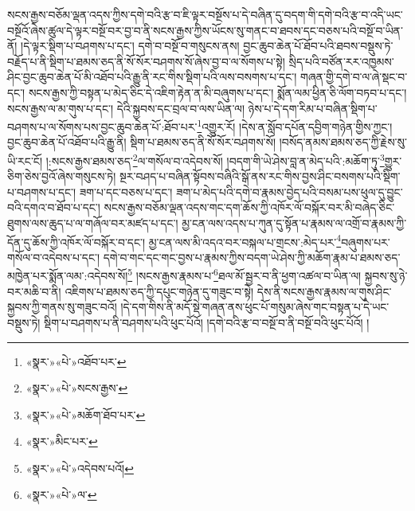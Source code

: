 སངས་རྒྱས་བཅོམ་ལྡན་འདས་ཀྱིས་དགེ་བའི་རྩ་བ་ཇི་ལྟར་བསྔོས་པ་དེ་བཞིན་དུ་བདག་གི་དགེ་བའི་རྩ་བ་འདི་ཡང་བསྔོའོ་ཞེས་ཚུལ་དེ་ལྟར་བསྔོ་བར་བྱ་བ་ནི་སངས་རྒྱས་ཀྱིས་ཡོངས་སུ་གནང་བ་ཐབས་དང་བཅས་པའི་བསྔོ་བ་ཡིན་ནོ། །དེ་ལྟར་སྡིག་པ་བཤགས་པ་དང་། དགེ་བ་བསྔོ་བ་གསུངས་ནས། བྱང་ཆུབ་ཆེན་པོ་ཐོབ་པའི་ཐབས་བསྡུས་ཏེ་བརྗོད་པ་ནི་སྡིག་པ་ཐམས་ཅད་ནི་སོ་སོར་བཤགས་སོ་ཞེས་བྱ་བ་ལ་སོགས་པ་སྟེ། སྲིད་པའི་བཙོན་རར་འཁྱམས་ཤིང་བྱང་ཆུབ་ཆེན་པོ་མི་འཐོབ་པའི་རྒྱུ་ནི་རང་གིས་སྡིག་པའི་ལས་བསགས་པ་དང་། གཞན་གྱི་དགེ་བ་ལ་ཞེ་སྡང་བ་དང་། སངས་རྒྱས་ཀྱི་བསྟན་པ་མེད་ཅིང་དེ་འཇིག་རྟེན་ན་མི་བཞུགས་པ་དང་། སྨོན་ལམ་ཕྱིན་ཅི་ལོག་བཏབ་པ་དང་། སངས་རྒྱས་ལ་མ་གུས་པ་དང་། དེའི་སྐྱབས་དང་བྲལ་བ་ལས་ཡིན་ལ། ཉེས་པ་དེ་དག་རིམ་པ་བཞིན་སྡིག་པ་བཤགས་པ་ལ་སོགས་པས་བྱང་ཆུབ་ཆེན་པོ་:ཐོབ་པར་\footnote{«སྣར་»«པེ་»འཐོབ་པར་}འགྱུར་རོ། །དེས་ན་སློབ་དཔོན་དབྱིག་གཉེན་གྱིས་ཀྱང་། བྱང་ཆུབ་ཆེན་པོ་འཐོབ་པའི་རྒྱུ་ནི། སྡིག་པ་ཐམས་ཅད་ནི་སོ་སོར་བཤགས་སོ། །བསོད་ནམས་ཐམས་ཅད་ཀྱི་རྗེས་སུ་ཡི་རང་ངོ། །:སངས་རྒྱས་ཐམས་ཅད་\footnote{«སྣར་»«པེ་»སངས་རྒྱས་}ལ་གསོལ་བ་འདེབས་སོ། །བདག་གི་ཡེ་ཤེས་བླ་ན་མེད་པའི་:མཆོག་ཏུ་\footnote{«སྣར་»«པེ་»མཆོག་ཐོབ་པར་}གྱུར་ཅིག་ཅེས་བྱའོ་ཞེས་གསུངས་ཏེ། སྔར་བཤད་པ་བཞིན་སྟོབས་བཞིའི་སྒོ་ནས་རང་གིས་བྱས་ཤིང་བསགས་པའི་སྡིག་པ་བཤགས་པ་དང་། ཟག་པ་དང་བཅས་པ་དང་། ཟག་པ་མེད་པའི་དགེ་བ་རྣམས་བྱེད་པའི་བསམ་པས་ཕུལ་དུ་བྱུང་བའི་དགའ་བ་ཐོབ་པ་དང་། སངས་རྒྱས་བཅོམ་ལྡན་འདས་གང་དག་ཆོས་ཀྱི་འཁོར་ལོ་བསྐོར་བར་མི་བཞེད་ཅིང་ཐུགས་ལས་ཆུད་པ་ལ་གཞོལ་བར་མཛད་པ་དང་། མྱ་ངན་ལས་འདས་པ་ཀུན་དུ་སྟོན་པ་རྣམས་ལ་འགྲོ་བ་རྣམས་ཀྱི་དོན་དུ་ཆོས་ཀྱི་འཁོར་ལོ་བསྐོར་བ་དང་། མྱ་ངན་ལས་མི་འདའ་བར་བསྐལ་པ་གྲངས་:མེད་པར་\footnote{«སྣར་»མིང་པར་}བཞུགས་པར་གསོལ་བ་འདེབས་པ་དང་། དགེ་བ་གང་དང་གང་བྱས་པ་རྣམས་ཀྱིས་བདག་ཡེ་ཤེས་ཀྱི་མཆོག་རྣམ་པ་ཐམས་ཅད་མཁྱེན་པར་སྨོན་ལམ་:འདེབས་སོ།\footnote{«སྣར་»«པེ་»འདེབས་པའོ།} །སངས་རྒྱས་རྣམས་པ་\footnote{«སྣར་»«པེ་»ལ་}ཐལ་མོ་སྦྱར་བ་ནི་ཕྱག་འཚལ་བ་ཡིན་ལ། སྐྱབས་སུ་ཉེ་བར་མཆི་བ་ནི། འཇིགས་པ་ཐམས་ཅད་ཀྱི་དཔུང་གཉེན་དུ་གཟུང་བ་སྟེ། དེས་ནི་སངས་རྒྱས་རྣམས་ལ་གུས་ཤིང་སྐྱབས་ཀྱི་གནས་སུ་གཟུང་བའོ། །དེ་དག་གིས་ནི་མདོ་སྡེ་གཞན་ནས་ཕུང་པོ་གསུམ་ཞེས་གང་བསྟན་པ་དེ་ཡང་བསྡུས་ཏེ། སྡིག་པ་བཤགས་པ་ནི་བཤགས་པའི་ཕུང་པོའོ། །དགེ་བའི་རྩ་བ་བསྔོ་བ་ནི་བསྔོ་བའི་ཕུང་པོའོ། །
